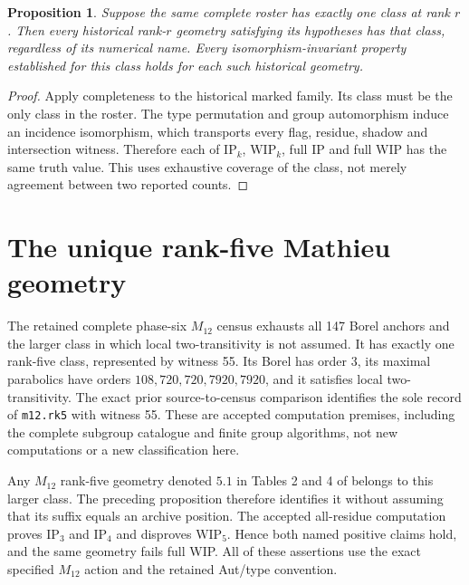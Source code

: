 \documentclass[11pt,a4paper]{article}
\newtheorem{proposition}{Proposition}
\begin{document}
\begin{proposition}
Suppose the same complete roster has exactly one class at rank $r$.
Then every historical rank-$r$ geometry satisfying its hypotheses has
that class, regardless of its numerical name. Every isomorphism-invariant
property established for this class holds for each such historical geometry.
\end{proposition}
\begin{proof}
Apply completeness to the historical marked family. Its class must be
the only class in the roster. The type permutation and group automorphism
induce an incidence isomorphism, which transports every flag, residue,
shadow and intersection witness. Therefore each of $\mathrm{IP}_k$,
$\mathrm{WIP}_k$, full IP and full WIP has the same truth value.
This uses exhaustive coverage of the class, not merely agreement between
two reported counts.
\end{proof}

\section{The unique rank-five Mathieu geometry}
The retained complete phase-six $M_{12}$ census exhausts all 147 Borel
anchors and the larger class in which local two-transitivity is not
assumed. It has exactly one rank-five class, represented by witness 55.
Its Borel has order 3, its maximal parabolics have orders
$108,720,720,7920,7920$, and it satisfies local two-transitivity.
The exact prior source-to-census comparison identifies the sole record
of \texttt{m12.rk5} with witness 55. These are accepted computation
premises, including the complete subgroup catalogue and finite group
algorithms, not new computations or a new classification here.

Any $M_{12}$ rank-five geometry denoted $5.1$ in Tables 2 and 4 of
\cite{JL} belongs to this larger class. The preceding proposition therefore
identifies it without assuming that its suffix equals an archive position.
The accepted all-residue computation proves $\mathrm{IP}_3$ and
$\mathrm{IP}_4$ and disproves $\mathrm{WIP}_5$. Hence both named positive
claims hold, and the same geometry fails full WIP. All of these assertions
use the exact specified $M_{12}$ action and the retained Aut/type convention.
\end{document}
